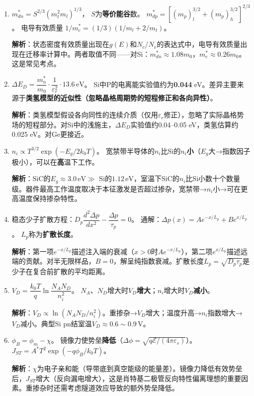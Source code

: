 \documentclass[12pt,a4paper]{ctexart}
\begin{document}
\begin{enumerate}[label=\arabic*.,nosep,leftmargin=2em]

\item
$m_{dn}^* = S^{2/3}(m_t^2 m_l)^{1/3}$，
$S$为\textbf{等价能谷}数。
$m_{dp}^* = [(m_p)_l^{3/2} + (m_p)_h^{3/2}]^{2/3}$。
电导有效质量 $1/m_c^* = (1/3)(1/m_l + 2/m_t)$。

\textbf{解析}：状态密度有效质量出现在$g(E)$和$N_c$/$N_v$的表达式中，电导有效质量出现在迁移率计算中。两者取值不同——对Si：$m_{dn}^* \approx 1.08m_0$，$m_c^* \approx 0.26m_0$。这是常见考点。

\item
$\Delta E_D = \dfrac{m_n^*}{m_0} \cdot \dfrac{1}{\varepsilon_r^2} \cdot 13.6\,\text{eV}$。
Si中P的电离能实验值约为\textbf{0.044} eV。差异主要来源于\textbf{类氢模型的近似性（忽略晶格周期势的短程修正和各向异性）}。

\textbf{解析}：类氢模型假设各向同性的连续介质（仅用$\varepsilon_r$修正），忽略了实际晶格势场的短程部分。对Si中的浅施主，$\Delta E_D$实验值约0.04--0.05 eV，类氢估算约0.025 eV。对Ge更接近。

\item
$n_i \propto T^{3/2}\exp(-E_g/2k_0T)$。
宽禁带半导体的$n_i$比Si的$n_i$\textbf{小}（$E_g$大→指数因子极小），可以在\textbf{高}温下工作。

\textbf{解析}：SiC的$E_g \approx 3.0\,\text{eV} \gg$ Si的$1.12\,\text{eV}$，室温下SiC的$n_i$比Si小数十个数量级。器件最高工作温度取决于本征激发是否超过掺杂，宽禁带→$n_i$小→可在更高温度保持掺杂特性。

\item
稳态少子扩散方程：$D_p\dfrac{d^2\Delta p}{dx^2} - \dfrac{\Delta p}{\tau_p} = 0$。
通解：$\Delta p(x) = Ae^{-x/L_p} + Be^{x/L_p}$。
$L_p$称为\textbf{扩散长度}。

\textbf{解析}：第一项$e^{-x/L_p}$描述注入端的衰减（$x > 0$时$Ae^{-x/L_p}$），第二项$e^{x/L_p}$描述远端的贡献。对半无限样品，$B = 0$，解呈纯指数衰减。扩散长度$L_p = \sqrt{D_p\tau_p}$是少子在复合前扩散的平均距离。

\item
$V_D = \dfrac{k_0T}{q}\ln\dfrac{N_A N_D}{n_i^2}$。
$N_A$、$N_D$增大时$V_D$\textbf{增大}；$n_i$增大时$V_D$\textbf{减小}。

\textbf{解析}：$V_D \propto \ln(N_A N_D/n_i^2)$。重掺杂→$V_D$增大；温度升高→$n_i$指数增大→$V_D$减小。典型Si pn结室温$V_D \approx 0.6\sim0.9\,\text{V}$。

\item
$\phi_B = \phi_m - \chi$。
镜像力使势垒\textbf{降低}（$\Delta\phi = \sqrt{q\mathcal{E}/(4\pi\varepsilon_s)}$）。
$J_{ST} = A^* T^2 \exp(-q\phi_B/k_0T)$。

\textbf{解析}：$\chi$为电子亲和能（导带底到真空能级的能量差）。镜像力降低有效势垒后，$J_{ST}$增大（反向漏电增大），这是肖特基二极管反向特性偏离理想的重要因素。重掺杂时还需考虑隧道效应导致的额外势垒降低。

\end{enumerate}
\end{document}
